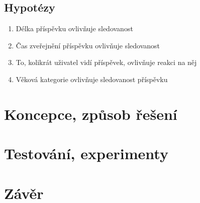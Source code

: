 \documentclass[11pt, a4paper]{article}
\begin{document}
\subsection{Hypotézy}
\begin{enumerate}
    \item Délka příspěvku ovlivňuje sledovanost
    \item Čas zveřejnění příspěvku ovlivňuje sledovanost
    \item To, kolikrát uživatel vidí příspěvek, ovlivňuje reakci na něj
    \item Věková kategorie ovlivňuje sledovanost příspěvku
\end{enumerate}

\section{Koncepce, způsob řešení}

\section{Testování, experimenty}

\section{Závěr}



    
\end{document}
